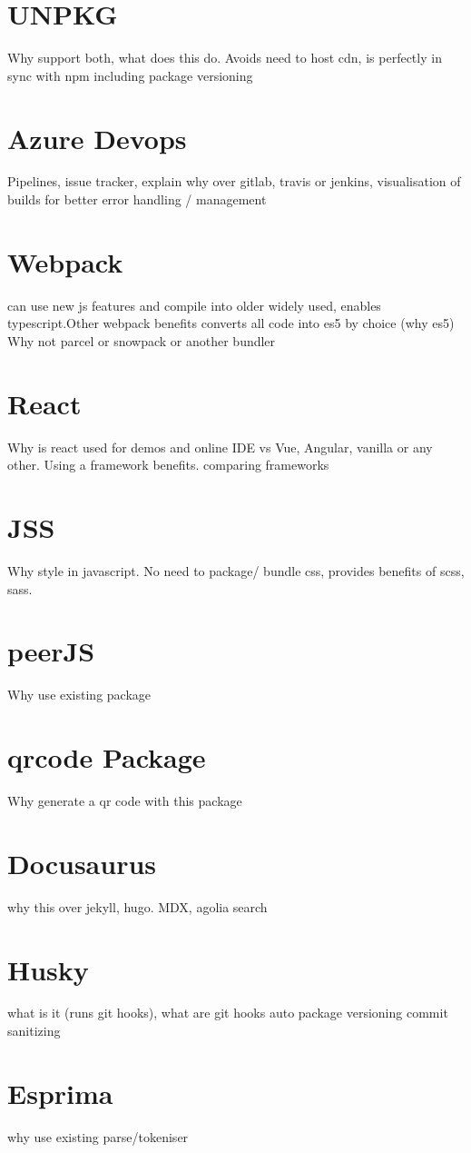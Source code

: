 \documentclass{l4proj}
\begin{document}
\section{UNPKG}
\text Why support both, what does this do. Avoids need to host cdn, is perfectly in sync with npm including package versioning
\section{Azure Devops}
\text Pipelines, issue tracker, explain why over gitlab, travis or jenkins, visualisation of builds for better error handling / management
\section{Webpack}
\text can use new js features and compile into older widely used, enables typescript.Other webpack benefits converts all code into es5 by choice (why es5)
Why not parcel or snowpack or another bundler
\section{React}
\text Why is react used for demos and online IDE vs Vue, Angular, vanilla or any other. Using a framework benefits.
comparing frameworks
\section{JSS}
\text Why style in javascript. No need to package/ bundle css, provides benefits of scss, sass.
\section{peerJS}
\text Why use existing package
\section{qrcode Package}
\text Why generate a qr code with this package
\section{Docusaurus}
\text why this over jekyll, hugo. MDX, agolia search
\section{Husky}
\text what is it (runs git hooks), what are git hooks
auto package versioning
commit sanitizing
\section{Esprima}
\text why use existing parse/tokeniser
\end{document}
